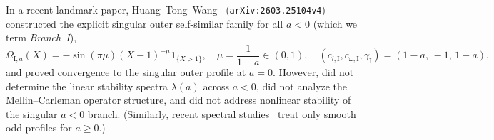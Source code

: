 \documentclass[11pt,a4paper]{article}
\begin{document}
In a recent landmark paper, Huang--Tong--Wang~\cite{HuangTongWang2026} (\texttt{arXiv:2603.25104v4}) constructed the explicit singular outer self-similar family for all $a < 0$ (which we term \emph{Branch~I}),
\begin{equation}\label{eq:branch1}
\bar\Omega_{\mathrm{I},a}(X) = -\sin(\pi\mu)(X-1)^{-\mu}\mathbf{1}_{\{X>1\}}, \quad \mu = \frac{1}{1-a}\in(0,1), \quad (\bar c_{l,\mathrm{I}}, \bar c_{\omega,\mathrm{I}}, \gamma_{\mathrm{I}}) = (1-a,\,-1,\,1-a),
\end{equation}
and proved convergence to the singular outer profile at $a = 0$. However, \cite{HuangTongWang2026} did not determine the linear stability spectra $\lambda(a)$ across $a < 0$, did not analyze the Mellin--Carleman operator structure, and did not address nonlinear stability of the singular $a < 0$ branch. (Similarly, recent spectral studies~\cite{Xu2026a,Xu2026b} treat only smooth odd profiles for $a \ge 0$.)
\end{document}
